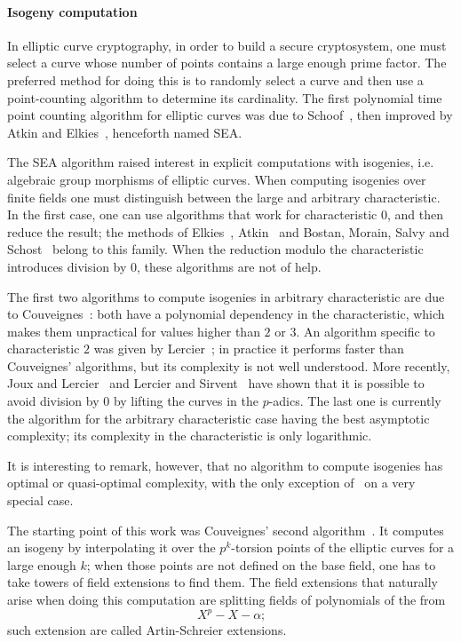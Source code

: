\paragraph{Isogeny computation}
\label{sec:isogeny-computation}
In elliptic curve cryptography, in order to build a secure
cryptosystem, one must select a curve whose number of points contains
a large enough prime factor. The preferred method for doing this is to
randomly select a curve and then use a point-counting algorithm to
determine its cardinality. The first polynomial time point counting
algorithm for elliptic curves was due to Schoof~\cite{schoof85}, then
improved by Atkin and
Elkies~\cite{atkin88,elkies92,elkies98,schoof95}, henceforth named
SEA.

The SEA algorithm raised interest in explicit computations with
isogenies, i.e. algebraic group morphisms of elliptic curves. When
computing isogenies over finite fields one must distinguish between
the large and arbitrary characteristic. In the first case, one can use
algorithms that work for characteristic $0$, and then reduce the
result; the methods of Elkies~\cite{elkies98,morain95},
Atkin~\cite{schoof95} and Bostan, Morain, Salvy and
Schost~\cite{bostan+morain+salvy+schost08} belong to this family. When
the reduction modulo the characteristic introduces division by $0$,
these algorithms are not of help.

The first two algorithms to compute isogenies in arbitrary
characteristic are due to Couveignes~\cite{couveignes94,couveignes96}:
both have a polynomial dependency in the characteristic, which makes
them unpractical for values higher than $2$ or $3$. An algorithm
specific to characteristic $2$ was given by Lercier~\cite{lercier96};
in practice it performs faster than Couveignes' algorithms, but its
complexity is not well understood. More recently, Joux and
Lercier~\cite{joux+lercier06} and Lercier and
Sirvent~\cite{lercier+sirvent08} have shown that it is possible to
avoid division by $0$ by lifting the curves in the $p$-adics. The last
one is currently the algorithm for the arbitrary characteristic case
having the best asymptotic complexity; its complexity in the
characteristic is only logarithmic.

It is interesting to remark, however, that no algorithm to compute
isogenies has optimal or quasi-optimal complexity, with the only
exception of~\cite{bostan+morain+salvy+schost08} on a very special
case. 

The starting point of this work was Couveignes' second
algorithm~\cite{couveignes96}. It computes an isogeny by interpolating
it over the $p^k$-torsion points of the elliptic curves for a large
enough $k$; when those points are not defined on the base field, one
has to take towers of field extensions to find them. The field
extensions that naturally arise when doing this computation are
splitting fields of polynomials of the from
\[X^p - X -\alpha\text{;}\] such extension are called Artin-Schreier
extensions. 


